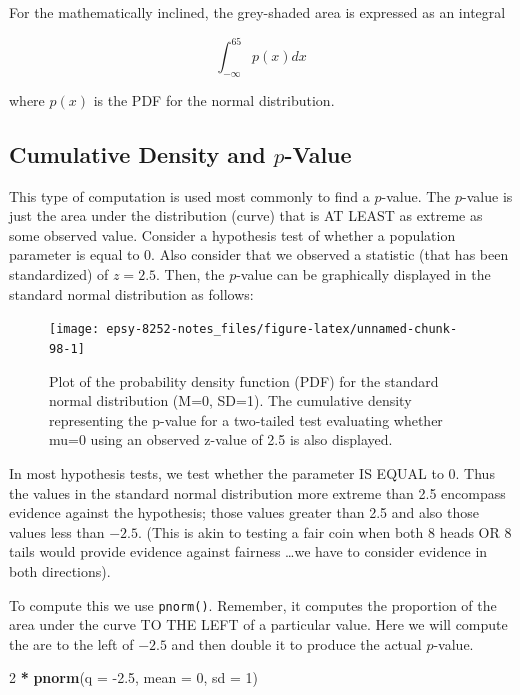 \documentclass[]{book}
\newenvironment{Shaded}{\begin{snugshade}}{\end{snugshade}}
\newcommand{\DataTypeTok}[1]{\textcolor[rgb]{0.13,0.29,0.53}{#1}}
\newcommand{\DecValTok}[1]{\textcolor[rgb]{0.00,0.00,0.81}{#1}}
\newcommand{\FloatTok}[1]{\textcolor[rgb]{0.00,0.00,0.81}{#1}}
\newcommand{\KeywordTok}[1]{\textcolor[rgb]{0.13,0.29,0.53}{\textbf{#1}}}
\newcommand{\NormalTok}[1]{#1}
\newcommand{\OperatorTok}[1]{\textcolor[rgb]{0.81,0.36,0.00}{\textbf{#1}}}
\newcommand{\StringTok}[1]{\textcolor[rgb]{0.31,0.60,0.02}{#1}}
\begin{document}
For the mathematically inclined, the grey-shaded area is expressed as an integral

\[
\int_{-\infty}^{65} p(x) dx
\]

where \(p(x)\) is the PDF for the normal distribution.

\hypertarget{cumulative-density-and-p-value}{%
\subsection{\texorpdfstring{Cumulative Density and \(p\)-Value}{Cumulative Density and p-Value}}\label{cumulative-density-and-p-value}}

This type of computation is used most commonly to find a \(p\)-value. The \(p\)-value is just the area under the distribution (curve) that is AT LEAST as extreme as some observed value. Consider a hypothesis test of whether a population parameter is equal to 0. Also consider that we observed a statistic (that has been standardized) of \(z=2.5\). Then, the \(p\)-value can be graphically displayed in the standard normal distribution as follows:

\begin{figure}

{\centering \texttt{[image: epsy-8252-notes\_files/figure-latex/unnamed-chunk-98-1]} 

}

\caption{Plot of the probability density function (PDF) for the standard normal distribution (M=0, SD=1). The cumulative density representing the p-value for a two-tailed test evaluating whether mu=0 using an observed z-value of 2.5 is also displayed.}\label{fig:unnamed-chunk-98}
\end{figure}

In most hypothesis tests, we test whether the parameter IS EQUAL to 0. Thus the values in the standard normal distribution more extreme than 2.5 encompass evidence against the hypothesis; those values greater than 2.5 and also those values less than \(-2.5\). (This is akin to testing a fair coin when both 8 heads OR 8 tails would provide evidence against fairness \ldots we have to consider evidence in both directions).

To compute this we use \texttt{pnorm()}. Remember, it computes the proportion of the area under the curve TO THE LEFT of a particular value. Here we will compute the are to the left of \(-2.5\) and then double it to produce the actual \(p\)-value.

\begin{Shaded}
\begin{Highlighting}[]
\DecValTok{2} \OperatorTok{*}\StringTok{ }\KeywordTok{pnorm}\NormalTok{(}\DataTypeTok{q =} \FloatTok{-2.5}\NormalTok{, }\DataTypeTok{mean =} \DecValTok{0}\NormalTok{, }\DataTypeTok{sd =} \DecValTok{1}\NormalTok{)}
\end{Highlighting}
\end{Shaded}
\end{document}
